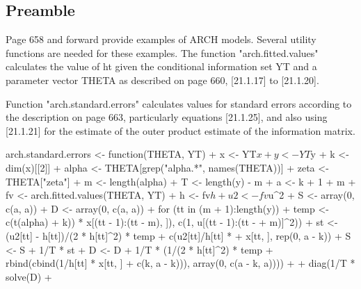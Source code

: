 \documentclass[a4paper]{article}
\begin{document}
\subsection{Preamble}
Page 658 and forward provide examples of ARCH models.  Several utility functions are needed for these examples.
The function "arch.fitted.values" calculates the value of ht given the conditional information set YT and
a parameter vector THETA as described on page 660, [21.1.17] to [21.1.20].
\begin{Schunk}
\end{Schunk}
Function "arch.standard.errors" calculates values for standard errors according to the description on page 663,
particularly equations [21.1.25], and also using [21.1.21] for the estimate of the outer product estimate of the
information matrix.
\begin{Schunk}
\begin{Sinput}
 arch.standard.errors <- function(THETA, YT) {
+     x <- YT$x
+     y <- YT$y
+     k <- dim(x)[[2]]
+     alpha <- THETA[grep("alpha.*", names(THETA))]
+     zeta <- THETA["zeta"]
+     m <- length(alpha)
+     T <- length(y) - m
+     a <- k + 1 + m
+     fv <- arch.fitted.values(THETA, YT)
+     h <- fv$h
+     u2 <- fv$u^2
+     S <- array(0, c(a, a))
+     D <- array(0, c(a, a))
+     for (tt in (m + 1):length(y)) {
+         temp <- c(t(alpha) %
+             k)) * x[(tt - 1):(tt - m), ]), c(1, u[(tt - 1):(tt - 
+             m)]^2))
+         st <- (u2[tt] - h[tt])/(2 * h[tt]^2) * temp + c(u2[tt]/h[tt] * 
+             x[tt, ], rep(0, a - k))
+         S <- S + 1/T * st %
+         D <- D + 1/T * (1/(2 * h[tt]^2) * temp %
+             rbind(cbind(1/h[tt] * x[tt, ] %
+                 c(k, a - k))), array(0, c(a - k, a))))
+     }
+     diag(1/T * solve(D) %
+ }
\end{Sinput}
\end{Schunk}
\end{document}
